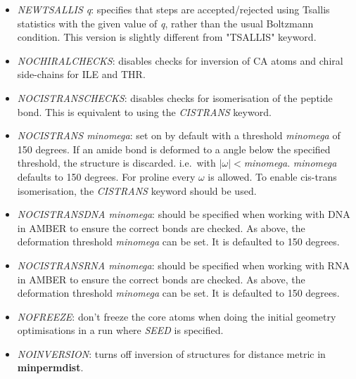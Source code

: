 \documentclass[12pt,a4paper,dvips]{article}
\begin{document}
\begin{itemize}


\item {\it NEWTSALLIS q\/}: specifies that steps are accepted/rejected using Tsallis statistics with the
given value of {\it q\/}, rather than the usual Boltzmann condition. This version is slightly different from "TSALLIS" keyword.

\item {\it NOCHIRALCHECKS\/}: disables checks for inversion of CA atoms and chiral side-chains for ILE and THR.

\item {\it NOCISTRANSCHECKS\/}: disables checks for isomerisation of the peptide bond. This is equivalent to using the {\it CISTRANS} keyword.

\item {\it NOCISTRANS minomega\/}: set on by default with a threshold {\it minomega} of 150 degrees.  
If an amide bond is deformed to a angle below the specified threshold, the structure is discarded. 
i.e.~with $|\omega|<${\it minomega}. {\it minomega\/} defaults to 150 degrees. 
For proline every $\omega$ is allowed. To enable cis-trans isomerisation, the {\it CISTRANS} keyword should be used. 

\item {\it NOCISTRANSDNA minomega\/}: should be specified when working with DNA in AMBER to ensure the correct bonds are 
checked. As above, the deformation threshold {\it minomega} can be set. It is defaulted to 150 degrees.

\item {\it NOCISTRANSRNA minomega\/}: should be specified when working with RNA in AMBER to ensure the correct bonds are 
checked. As above, the deformation threshold {\it minomega} can be set. It is defaulted to 150 degrees.

\item {\it NOFREEZE\/}: don't freeze the core atoms when doing the initial geometry optimisations in 
a run where {\it SEED\/} is specified.

\item {\it NOINVERSION\/}: turns off inversion of structures for distance
metric in {\bf minpermdist}.


\end{itemize}
\end{document}
